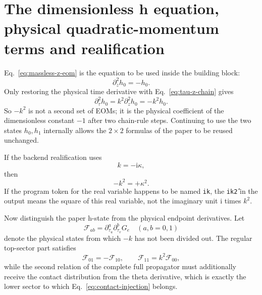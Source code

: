 \documentclass[11pt,a4paper]{article}
\newcommand{\ii}{\mathrm i}
\begin{document}
\section{The dimensionless h equation, physical quadratic-momentum terms and realification}
\label{sec:physical-k2}

Eq.~\eqref{eq:massless-z-eom} is the equation to be used inside the building block:
\begin{equation}
 \partial_z^2h_0=-h_0.
\end{equation}
Only restoring the physical time derivative with Eq.~\eqref{eq:tau-z-chain} gives
\begin{equation}
 \boxed{
 \partial_\tau^2h_0
 =k^2\partial_z^2h_0
 =-k^2h_0.
 }
 \label{eq:physical-second-derivative}
\end{equation}
So $-k^2$ is not a second set of EOMs; it is the physical coefficient of the dimensionless constant $-1$ after two chain-rule steps. Continuing to use the two states $h_0,h_1$ internally allows the $2\times2$ formulas of the paper to be reused unchanged.

If the backend realification uses
\begin{equation}
 k=-\ii\kappa,
\end{equation}
then
\begin{equation}
 -k^2=+\kappa^2.
\end{equation}
If the program token for the real variable happens to be named \texttt{ik}, the \texttt{ik\^2} in the output means the square of this real variable, not the imaginary unit $\ii$ times $k^2$.

Now distinguish the paper h-state from the physical endpoint derivatives. Let
\begin{equation}
 \mathcal F_{ab}
 =\partial_{\tau_u}^{a}\partial_{\tau_v}^{b}G_e
 \quad(a,b=0,1)
\end{equation}
denote the physical states from which $-k$ has not been divided out. The regular top-sector part satisfies
\begin{equation}
 \mathcal F_{01}=-\mathcal F_{10},
 \qquad
 \mathcal F_{11}=k^2\mathcal F_{00},
 \label{eq:physical-massless-relations}
\end{equation}
while the second relation of the complete full propagator must additionally receive the contact distribution from the theta derivative, which is exactly the lower sector to which Eq.~\eqref{eq:contact-injection} belongs.
\end{document}
